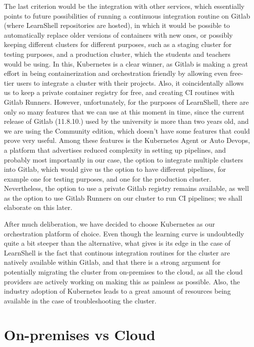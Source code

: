 \documentclass[thesis=B,english]{FITthesis}[2019/12/23]
\begin{document}
The last criterion would be the integration with other services, which essentially points to future possibilities of running a continuous integration routine on Gitlab (where LearnShell repositories are hosted), in which it would be possible to automatically replace older versions of containers with new ones, or possibly keeping different clusters for different purposes, such as a staging cluster for testing purposes, and a production cluster, which the students and teachers would be using. In this, Kubernetes is a clear winner, as Gitlab is making a great effort in being containerization and orchestration friendly by allowing even free-tier users to integrate a cluster with their projects. \cite{gitlab-kube} Also, it coincidentally allows us to keep a private container registry for free, and creating CI routines with Gitlab Runners. However, unfortunately, for the purposes of LearnShell, there are only so many features that we can use at this moment in time, since the current release of Gitlab (11.8.10.) used by the university is more than two years old, and we are using the Community edition, which doesn't have some features that could prove very useful. Among these features is the Kubernetes Agent or Auto Devops, a platform that advertises reduced complexity in setting up pipelines, and probably most importantly in our case, the option to integrate multiple clusters into Gitlab, which would give us the option to have different pipelines, for example one for testing purposes, and one for the production cluster. Nevertheless, the option to use a private Gitlab registry remains available, as well as the option to use Gitlab Runners on our cluster to run CI pipelines; we shall elaborate on this later.

After much deliberation, we have decided to choose Kubernetes as our orchestration platform of choice. Even though the learning curve is undoubtedly quite a bit steeper than the alternative, what gives is its edge in the case of LearnShell is the fact that continous integration routines for the cluster are natively available within Gitlab, and that there is a strong argument for potentially migrating the cluster from on-premises to the cloud, as all the cloud providers are actively working on making this as painless as possible. Also, the industry adoption of Kubernetes leads to a great amount of resources being available in the case of troubleshooting the cluster.

\section{On-premises vs Cloud}
\end{document}
